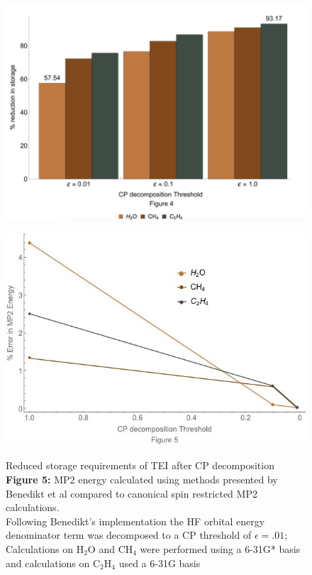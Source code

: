 	\begin{figure}
		\centering
			\begin{minipage}{.5\textwidth}
			  \centering
			  \includegraphics[width=1\linewidth]{./plots/Store}
			  \label{fig:Figure 4}
			\end{minipage}%
			\begin{minipage}{.5\textwidth}
			  \centering
			  \includegraphics[width=1 \linewidth]{./plots/Energy}
			  \label{fig:Figure 5}
			\end{minipage}
			\caption{Reduced storage requirements of TEI after CP decomposition\\
			\textbf{Figure 5:} MP2 energy calculated using methods presented by Benedikt et al\cite{Benedikt2011} compared to canonical spin restricted MP2 calculations.\\
			Following Benedikt's implementation the HF orbital energy denominator term was decomposed to a CP threshold of $\epsilon = .01$; Calculations on $\text{H}_2\text{O}$ and $\text{CH}_4$ were performed using a 6-31G* basis and calculations on $\text{C}_2\text{H}_4$ used a 6-31G basis}
		\end{figure}


